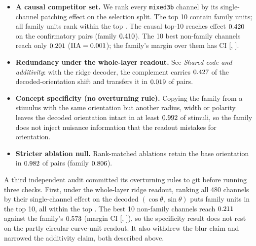 \documentclass[11pt]{article}
\newcommand{\iia}{\mathrm{IIA}}
\begin{document}
\begin{itemize}
\item \textbf{A causal competitor set.} We rank every \texttt{mixed3b} channel by its single-channel patching effect on the selection split. The top 10 contain \AuTopOverlap{} family units; all family units rank within the top \AuFamRankMax. The causal top-10 reaches effect $0.420$ on the confirmatory pairs (family $0.410$). The 10 best non-family channels reach only $0.201$ ($\iia=\AuTopNFIIA$); the family's margin over them has CI [\AuDiffNFLo, \AuDiffNFHi].
\item \textbf{Redundancy under the whole-layer readout.} See \emph{Shared code and additivity}: with the ridge decoder, the complement carries $0.427$ of the decoded-orientation shift and transfers it in $0.019$ of pairs.
\item \textbf{Concept specificity (no overturning rule).} Copying the family from a stimulus with the same orientation but another radius, width or polarity leaves the decoded orientation intact in at least $0.992$ of stimuli, so the family does not inject nuisance information that the readout mistakes for orientation.
\item \textbf{Stricter ablation null.} Rank-matched ablations retain the base orientation in $0.982$ of pairs (family $0.806$).
\end{itemize}
A third independent audit committed its overturning rules to git before running three checks. First, under the whole-layer ridge readout, ranking all 480 channels by their single-channel effect on the decoded $(\cos\theta,\sin\theta)$ puts \TrRidgeOverlap{} family units in the top 10, all within the top \TrRidgeFamRankMax. The best 10 non-family channels reach $0.211$ against the family's $0.573$ (margin CI [\TrRidgeDiffNFLo, \TrRidgeDiffNFHi]), so the specificity result does not rest on the partly circular curve-unit readout. It also withdrew the blur claim and narrowed the additivity claim, both described above.
\end{document}
